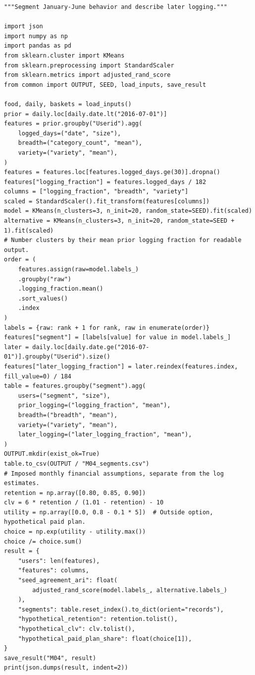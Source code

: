 \begin{Verbatim}[breaklines,breakanywhere,fontsize=\small]
"""Segment January-June behavior and describe later logging."""

import json
import numpy as np
import pandas as pd
from sklearn.cluster import KMeans
from sklearn.preprocessing import StandardScaler
from sklearn.metrics import adjusted_rand_score
from common import OUTPUT, SEED, load_inputs, save_result

food, daily, baskets = load_inputs()
prior = daily.loc[daily.date.lt("2016-07-01")]
features = prior.groupby("Userid").agg(
    logged_days=("date", "size"),
    breadth=("category_count", "mean"),
    variety=("variety", "mean"),
)
features = features.loc[features.logged_days.ge(30)].dropna()
features["logging_fraction"] = features.logged_days / 182
columns = ["logging_fraction", "breadth", "variety"]
scaled = StandardScaler().fit_transform(features[columns])
model = KMeans(n_clusters=3, n_init=20, random_state=SEED).fit(scaled)
alternative = KMeans(n_clusters=3, n_init=20, random_state=SEED + 1).fit(scaled)
# Number clusters by their mean prior logging fraction for readable output.
order = (
    features.assign(raw=model.labels_)
    .groupby("raw")
    .logging_fraction.mean()
    .sort_values()
    .index
)
labels = {raw: rank + 1 for rank, raw in enumerate(order)}
features["segment"] = [labels[value] for value in model.labels_]
later = daily.loc[daily.date.ge("2016-07-01")].groupby("Userid").size()
features["later_logging_fraction"] = later.reindex(features.index, fill_value=0) / 184
table = features.groupby("segment").agg(
    users=("segment", "size"),
    prior_logging=("logging_fraction", "mean"),
    breadth=("breadth", "mean"),
    variety=("variety", "mean"),
    later_logging=("later_logging_fraction", "mean"),
)
OUTPUT.mkdir(exist_ok=True)
table.to_csv(OUTPUT / "M04_segments.csv")
# Imposed monthly financial assumptions, separate from the log estimates.
retention = np.array([0.80, 0.85, 0.90])
clv = 6 * retention / (1.01 - retention) - 10
utility = np.array([0.0, 0.8 - 0.1 * 5])  # Outside option, hypothetical paid plan.
choice = np.exp(utility - utility.max())
choice /= choice.sum()
result = {
    "users": len(features),
    "features": columns,
    "seed_agreement_ari": float(
        adjusted_rand_score(model.labels_, alternative.labels_)
    ),
    "segments": table.reset_index().to_dict(orient="records"),
    "hypothetical_retention": retention.tolist(),
    "hypothetical_clv": clv.tolist(),
    "hypothetical_paid_plan_share": float(choice[1]),
}
save_result("M04", result)
print(json.dumps(result, indent=2))
\end{Verbatim}

